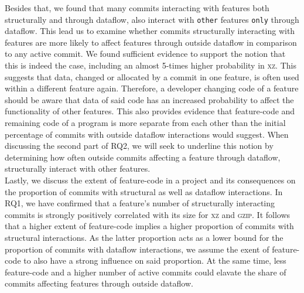 Besides that, we found that many commits interacting with features both structurally and through dataflow, also interact with \texttt{other} features \texttt{only} through dataflow.
This lead us to examine whether commits structurally interacting with features are more likely to affect features through outside dataflow in comparison to any active commit.
We found sufficient evidence to support the notion that this is indeed the case, including an almost 5-times higher probability in \textsc{xz}.
This suggests that data, changed or allocated by a commit in one feature, is often used within a different feature again.
Therefore, a developer changing code of a feature should be aware that data of said code has an increased probability to affect the functionality of other features.
This also provides evidence that feature-code and remaining code of a program is more separate from each other than the initial percentage of commits with outside dataflow interactions would suggest.
When discussing the second part of RQ2, we will seek to underline this notion by determining how often outside commits affecting a feature through dataflow, structurally interact with other features. \\
Lastly, we discuss the extent of feature-code in a project and its consequences on the proportion of commits with structural as well as dataflow interactions.
In RQ1, we have confirmed that a feature's number of structurally interacting commits is strongly positively correlated with its size for \textsc{xz} and \textsc{gzip}.
It follows that a higher extent of feature-code implies a higher proportion of commits with structural interactions.
As the latter proportion acts as a lower bound for the proportion of commits with dataflow interactions, we assume the exent of feature-code to also have a strong influence on said proportion.
At the same time, less feature-code and a higher number of active commits could elavate the share of commits affecting features through outside dataflow.
